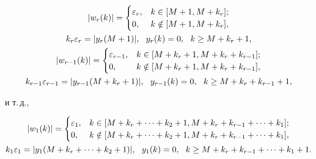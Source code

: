 \begin{gather}


|w_r(k)| =


\begin{cases}


\ve_r, & k \in [M+1, M + k_r];\\


0, & k \notin [M+1, M + k_r],


\end{cases}


\\


%


k_r\ve_r = |y_r(M+1)|,\ \ y_r(k) = 0,\ \ k \geq M+k_r+1,\notag \\


%


|w_{r-1}(k)| =


\begin{cases}


\ve_{r-1}, & k \in [M+k_r+1, M + k_r+k_{r-1}];\\


0, & k \notin [M+k_r+1, M + k_r+k_{r-1}],


\end{cases}


\\


%


k_{r-1}\ve_{r-1} = |y_{r-1}(M+k_r+1)|, \ \


y_{r-1}(k) = 0,\ \ k \geq M+k_r+k_{r-1}+1,\notag 


\end{gather}


и т.\,д.,


\begin{gather}


|w_1(k)| =


\begin{cases}


\ve_1, & k \in [M+k_r+\dotsb+k_2+1, M + k_r+k_{r-1}+\dotsb+k_1];\\


0, & k \notin [M+k_r+\dotsb+k_2+1, M + k_r+k_{r-1}+\dotsb+k_1],


\end{cases}


\\


k_1\ve_1 = |y_1(M+k_r+\dotsb+k_2+1)|,\ \


y_1(k) = 0,\ \ k \geq M+k_r+k_{r-1}+\dotsb+k_1+1.\notag


\end{gather}


